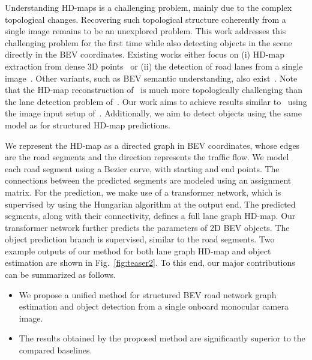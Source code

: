 \documentclass[10pt,twocolumn,letterpaper]{article}
\begin{document}
Understanding HD-maps is a challenging problem, mainly due to the complex topological changes. Recovering such topological structure coherently from a single image remains to be an unexplored problem. This work addresses this challenging problem for the first time while also detecting objects in the scene directly in the BEV coordinates. Existing works either focus on (i) HD-map extraction from dense 3D points~\cite{homayounfar2019dagmapper} or (ii) the detection of road lanes from a single image~\cite{hou2019learning}. Other variants, such as BEV semantic understanding, also exist~\cite{DBLP:conf/cvpr/RoddickC20,DBLP:journals/ral/LuMD19,DBLP:journals/ral/PanSLAZ20}. Note that the HD-map reconstruction of~\cite{homayounfar2019dagmapper} is much more topologically challenging than the lane detection problem of~\cite{hou2019learning}. Our work aims to achieve results similar to~\cite{homayounfar2019dagmapper} using the image input setup of~\cite{hou2019learning}. Additionally, we aim to detect objects using the same model as for structured HD-map predictions.





We represent the HD-map as a directed graph in BEV coordinates, whose edges are the road segments and the direction represents the traffic flow. We model each road segment using a Bezier curve, with starting and end points. The connections between the predicted segments are modeled using an assignment matrix. For the prediction, we make use of a transformer network, which is supervised by using the Hungarian algorithm at the output end. The predicted segments, along with their connectivity, defines a full lane graph HD-map. Our transformer network further predicts the parameters of 2D BEV objects. The object prediction branch is supervised, similar to the road segments. Two example outputs of our method for both lane graph HD-map and object estimation are shown in Fig.~\ref{fig:teaser2}. To this end, our major contributions can be summarized as follows. 
\begin{itemize}
\setlength{\itemsep}{0pt}
\setlength{\parskip}{0pt}
\item We propose a unified method for structured BEV road network graph estimation and object detection from a single onboard monocular camera image.
\item The results obtained by the proposed method are significantly superior to the compared baselines.
\end{itemize}
\end{document}
